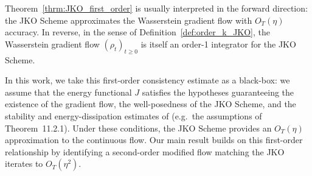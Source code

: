 \documentclass[reqno,11pt,letterpaper]{amsart}
\theoremstyle{plain}
\newtheorem{theorem}{Theorem}
\theoremstyle{definition}
\theoremstyle{remark}
\newcommand{\lr}[1]{\left(#1\right)}
\begin{document}
Theorem~\ref{thrm:JKO_first_order} is usually interpreted in the forward direction: the JKO Scheme approximates the Wasserstein gradient flow with $O_T(\eta)$ accuracy. In reverse, in the sense of Definition~\ref{def:order_k_JKO}, the Wasserstein gradient flow $(\rho_{t})_{t\geq0}$ is itself an order-1 integrator for the JKO Scheme.

In this work, we take this first-order consistency estimate as a black-box: we assume that the energy functional $J$ satisfies the hypotheses guaranteeing the existence of the gradient flow, the well-posedness of the JKO Scheme, and the stability and energy-dissipation estimates of \cite{AGS2008} (e.g.\ the assumptions of Theorem~11.2.1). Under these conditions, the JKO Scheme provides an $O_{T}(\eta)$ approximation to the continuous flow. Our main result builds on this first-order relationship by identifying a second-order modified flow matching the JKO iterates to $O_{T}(\eta^{2})$.

\end{document}
